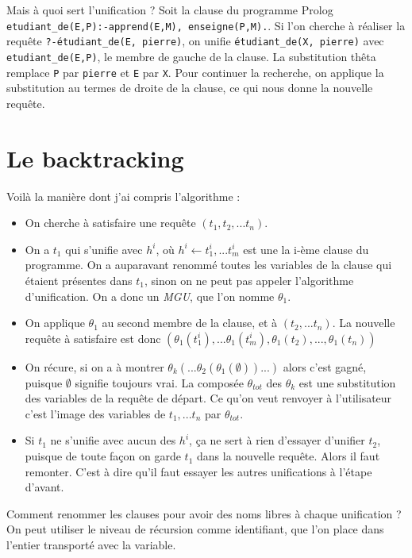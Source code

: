 \documentclass{article}
\begin{document}
Mais à quoi sert l'unification ? Soit la clause du programme Prolog \texttt{etudiant\_de(E,P):-apprend(E,M), enseigne(P,M).}. Si l'on cherche à réaliser la requête \texttt{?-étudiant\_de(E, pierre)}, on unifie \texttt{étudiant\_de(X, pierre)} avec \texttt{etudiant\_de(E,P)}, le membre de gauche de la clause. La substitution thêta remplace \texttt{P} par \texttt{pierre} et \texttt{E} par \texttt{X}. Pour continuer la recherche, on applique la substitution au termes de droite de la clause, ce qui nous donne la nouvelle requête.



\section{Le backtracking}

Voilà la manière dont j'ai compris l'algorithme :
\begin{itemize}
  \item
    On cherche à satisfaire une requête $(t_1, t_2, ... t_n)$.
  \item
    On a $t_1$ qui s'unifie avec $h^i$, où $h^i \leftarrow t^i_1,...t^i_m$ est une la i-ème clause du programme. On a auparavant renommé toutes les variables de la clause qui étaient présentes dans $t_1$, sinon on ne peut pas appeler l'algorithme d'unification. On a donc un \emph{MGU}, que l'on nomme $\theta_1$.
  \item
    On applique $\theta_1$ au second membre de la clause, et à $(t_2, ... t_n)$. La nouvelle requête à satisfaire est donc $(\theta_1(t^i_1), ... \theta_1(t^i_m), \theta_1(t_2), ..., \theta_1(t_n))$
  \item
    On récure, si on a à montrer $\theta_k( ... \theta_2(\theta_1(\emptyset)) ...)$ alors c'est gagné, puisque $\emptyset$ signifie toujours vrai. La composée $\theta_{tot}$ des $\theta_k$ est une substitution des variables de la requête de départ. Ce qu'on veut renvoyer à l'utilisateur c'est l'image des variables de $t_1, ... t_n$ par $\theta_{tot}$.
  \item
    Si $t_1$ ne s'unifie avec aucun des $h^i$, ça ne sert à rien d'essayer d'unifier $t_2$, puisque de toute façon on garde $t_1$ dans la nouvelle requête. Alors il faut remonter. C'est à dire qu'il faut essayer les autres unifications à l'étape d'avant.
\end{itemize}

Comment renommer les clauses pour avoir des noms libres à chaque unification ? On peut utiliser le niveau de récursion comme identifiant, que l'on place dans l'entier transporté avec la variable.
\end{document}
